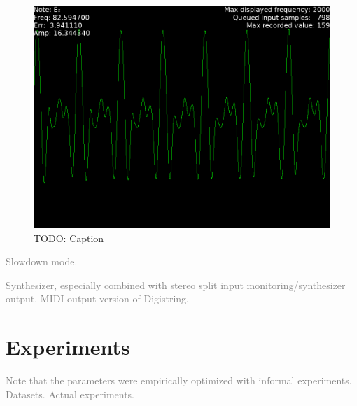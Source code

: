 \documentclass[a4paper,10pt,twocolumn]{article}
\begin{document}
\begin{figure}[h]
        \includegraphics[width=\linewidth]{fig/digi_wave.png}
    \caption{TODO: Caption}
    \label{fig:screens}
\end{figure}

\textcolor{gray}{Slowdown mode.}

\textcolor{gray}{Synthesizer, especially combined with stereo split input monitoring/synthesizer output. MIDI output version of Digistring.}






\section{Experiments}  \label{sec:exp}
\textcolor{gray}{Note that the parameters were empirically optimized with informal experiments. Datasets. Actual experiments.}
\end{document}
